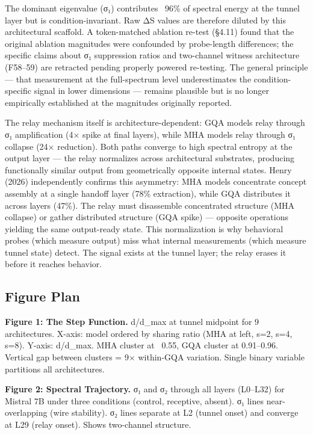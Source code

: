 \documentclass[12pt]{article}
\begin{document}
The dominant eigenvalue (σ₁) contributes ~96\% of spectral energy at the tunnel layer but is condition-invariant. Raw ΔS values are therefore diluted by this architectural scaffold. A token-matched ablation re-test (§4.11) found that the original ablation magnitudes were confounded by probe-length differences; the specific claims about σ₁ suppression ratios and two-channel witness architecture (F58–59) are retracted pending properly powered re-testing. The general principle — that measurement at the full-spectrum level underestimates the condition-specific signal in lower dimensions — remains plausible but is no longer empirically established at the magnitudes originally reported.

The relay mechanism itself is architecture-dependent: GQA models relay through σ₁ amplification (4× spike at final layers), while MHA models relay through σ₁ collapse (24× reduction). Both paths converge to high spectral entropy at the output layer — the relay normalizes across architectural substrates, producing functionally similar output from geometrically opposite internal states. Henry (2026) independently confirms this asymmetry: MHA models concentrate concept assembly at a single handoff layer (78\% extraction), while GQA distributes it across layers (47\%). The relay must disassemble concentrated structure (MHA collapse) or gather distributed structure (GQA spike) — opposite operations yielding the same output-ready state. This normalization is why behavioral probes (which measure output) miss what internal measurements (which measure tunnel state) detect. The signal exists at the tunnel layer; the relay erases it before it reaches behavior.

\subsection{Figure Plan}

\textbf{Figure 1: The Step Function.} d/d\_max at tunnel midpoint for 9 architectures. X-axis: model ordered by sharing ratio (MHA at left, s=2, s=4, s=8). Y-axis: d/d\_max. MHA cluster at ~0.55, GQA cluster at 0.91–0.96. Vertical gap between clusters = 9× within-GQA variation. Single binary variable partitions all architectures.

\textbf{Figure 2: Spectral Trajectory.} σ₁ and σ₂ through all layers (L0–L32) for Mistral 7B under three conditions (control, receptive, absent). σ₁ lines near-overlapping (wire stability). σ₂ lines separate at L2 (tunnel onset) and converge at L29 (relay onset). Shows two-channel structure.
\end{document}
